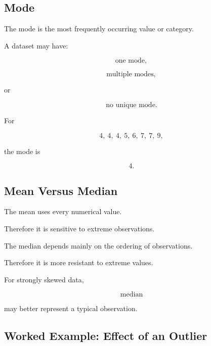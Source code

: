 \subsection{Mode}
\label{subsec:mode}

The mode is the most frequently occurring value or category.

A dataset may have:

\[
\boxed{
\text{one mode},
}
\]

\[
\boxed{
\text{multiple modes},
}
\]

or

\[
\boxed{
\text{no unique mode}.
}
\]

For

\[
4,\ 4,\ 4,\ 5,\ 6,\ 7,\ 7,\ 9,
\]

the mode is

\[
\boxed{
4.
}
\]

\subsection{Mean Versus Median}
\label{subsec:mean-versus-median}

The mean uses every numerical value.

Therefore it is sensitive to extreme observations.

The median depends mainly on the ordering of observations.

Therefore it is more resistant to extreme values.

For strongly skewed data,

\[
\boxed{
\text{median}
}
\]

may better represent a typical observation.

\subsection{Worked Example: Effect of an Outlier}
\label{subsec:worked-outlier-center}

